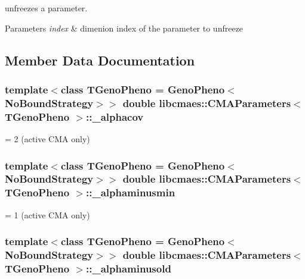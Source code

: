 unfreezes a parameter. 


\begin{DoxyParams}{Parameters}
{\em index} & dimenion index of the parameter to unfreeze \\
\hline
\end{DoxyParams}


\subsection{Member Data Documentation}
\hypertarget{classlibcmaes_1_1CMAParameters_ae13b411e5035c574e1521afa4b6d734b}{
\subsubsection[{\-\_\-alphacov}]{\setlength{\rightskip}{0pt plus 5cm}template$<$class T\-Geno\-Pheno = Geno\-Pheno$<$\-No\-Bound\-Strategy$>$$>$ double {\bf libcmaes\-::\-C\-M\-A\-Parameters}$<$ T\-Geno\-Pheno $>$\-::\-\_\-alphacov}}\label{classlibcmaes_1_1CMAParameters_ae13b411e5035c574e1521afa4b6d734b}
= 2 (active C\-M\-A only) \hypertarget{classlibcmaes_1_1CMAParameters_a8d4e4afdbdb72635241846562fc37a04}{
\subsubsection[{\-\_\-alphaminusmin}]{\setlength{\rightskip}{0pt plus 5cm}template$<$class T\-Geno\-Pheno = Geno\-Pheno$<$\-No\-Bound\-Strategy$>$$>$ double {\bf libcmaes\-::\-C\-M\-A\-Parameters}$<$ T\-Geno\-Pheno $>$\-::\-\_\-alphaminusmin}}\label{classlibcmaes_1_1CMAParameters_a8d4e4afdbdb72635241846562fc37a04}
= 1 (active C\-M\-A only) \hypertarget{classlibcmaes_1_1CMAParameters_a3dfb7a180cb3746a4bc3a2d82b8a8f35}{
\subsubsection[{\-\_\-alphaminusold}]{\setlength{\rightskip}{0pt plus 5cm}template$<$class T\-Geno\-Pheno = Geno\-Pheno$<$\-No\-Bound\-Strategy$>$$>$ double {\bf libcmaes\-::\-C\-M\-A\-Parameters}$<$ T\-Geno\-Pheno $>$\-::\-\_\-alphaminusold}}\label{classlibcmaes_1_1CMAParameters_a3dfb7a180cb3746a4bc3a2d82b8a8f35}

